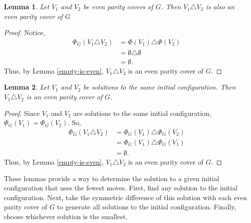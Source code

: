\documentclass[a4paper]{article}
\newtheorem{lemma}{Lemma}
\begin{document}
	\begin{lemma}
		Let $V_1$ and $V_2$ be even parity covers of $G$.
		Then $V_1 \triangle V_2$ is also an even parity cover of $G$
	\end{lemma}
	\begin{proof}
		Notice,
		\begin{align*}
			\Phi_G(V_1 \triangle V_2) &= \Phi(V_1) \triangle \Phi(V_2) \\
			&= \emptyset \triangle \emptyset \\
			&= \emptyset.
		\end{align*}
		Thus, by Lemma \ref{empty-is-even}, $V_1 \triangle V_2$ is an even parity cover of $G$.
	\end{proof}

	\begin{lemma}
		Let $V_1$ and $V_2$ be solutions to the same initial configuration.
		Then $V_1 \triangle V_2$ is an even parity cover of $G$.
	\end{lemma}
	\begin{proof}
		Since $V_1$ and $V_2$ are solutions to the same initial configuration, $\Phi_G(V_1) = \Phi_G(V_2)$.
		So,
		\begin{align*}
			\Phi_G(V_1 \triangle V_2) &= \Phi_G(V_1) \triangle \Phi_G(V_2) \\
			&= \Phi_G(V_1) \triangle \Phi_G(V_1) \\
			&= \emptyset.
		\end{align*}
		Thus, by Lemma \ref{empty-is-even}, $V_1 \triangle V_2$ is an even parity cover of $G$.
	\end{proof}

	These lemmas provide a way to determine the solution to a given initial configuration that uses the fewest moves.
	First, find any solution to the initial configuration.
	Next, take the symmetric difference of this solution with each even parity cover of $G$ to generate all solutions to the initial configuration.
	Finally, choose whichever solution is the smallest.
		
\end{document}
